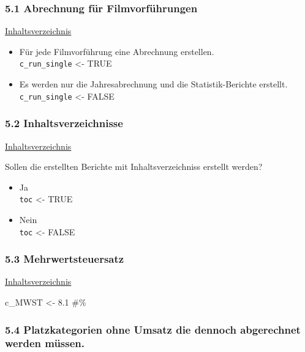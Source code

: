 \documentclass[
]{article}
\providecommand{\tightlist}{%
  \setlength{\itemsep}{0pt}\setlength{\parskip}{0pt}}
\begin{document}
\subsubsection{5.1 Abrechnung für
Filmvorführungen}\label{abrechnung-fuxfcr-filmvorfuxfchrungen}

\hyperref[Inhaltsverzeichnis]{Inhaltsverzeichnis}

\begin{itemize}
\tightlist
\item
  Für jede Filmvorführung eine Abrechnung erstellen.\\
  \texttt{c\_run\_single} \textless- TRUE
\item
  Es werden nur die Jahresabrechnung und die Statistik-Berichte
  erstellt.\\
  \texttt{c\_run\_single} \textless- FALSE
\end{itemize}

\subsubsection{5.2 Inhaltsverzeichnisse}\label{inhaltsverzeichnisse}

\hyperref[Inhaltsverzeichnis]{Inhaltsverzeichnis}

Sollen die erstellten Berichte mit Inhaltsverzeichniss erstellt werden?

\begin{itemize}
\tightlist
\item
  Ja\\
  \texttt{toc} \textless- TRUE
\item
  Nein\\
  \texttt{toc} \textless- FALSE
\end{itemize}

\subsubsection{5.3 Mehrwertsteuersatz}\label{mehrwertsteuersatz}

\hyperref[Inhaltsverzeichnis]{Inhaltsverzeichnis}

c\_MWST \textless- 8.1 \#\%

\subsubsection{5.4 Platzkategorien ohne Umsatz die dennoch abgerechnet
werden
müssen.}\label{platzkategorien-ohne-umsatz-die-dennoch-abgerechnet-werden-muxfcssen.}
\end{document}
